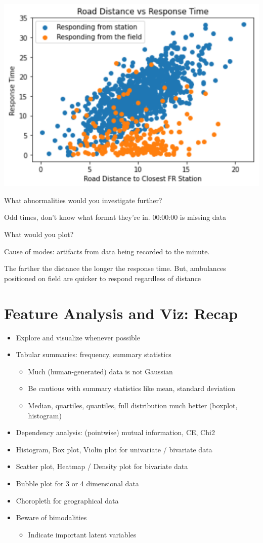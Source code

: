 \documentclass[11pt]{article}
\theoremstyle{definition}
\begin{document}
\includegraphics[width=\textwidth/2]{37.png}

What abnormalities would you investigate further?

Odd times, don't know what format they're in. 00:00:00 is missing data

What would you plot?

Cause of modes: artifacts from data being recorded to the minute.

The farther the distance the longer the response time. But, ambulances positioned on field are quicker to respond regardless of distance

\section{Feature Analysis and Viz: Recap}
\begin{itemize}
  \item Explore and visualize whenever possible
  \item Tabular summaries: frequency, summary statistics
  \begin{itemize}
    \item Much (human-generated) data is not Gaussian
    \item Be cautious with summary statistics like mean, standard deviation
    \item Median, quartiles, quantiles, full distribution much better (boxplot, histogram)
  \end{itemize}
  \item Dependency analysis: (pointwise) mutual information, CE, Chi2
  \item Histogram, Box plot, Violin plot for univariate / bivariate data
  \item Scatter plot, Heatmap / Density plot for bivariate data
  \item Bubble plot for 3 or 4 dimensional data
  \item Choropleth for geographical data
  \item Beware of bimodalities
  \begin{itemize}
    \item Indicate important latent variables
  \end{itemize}
\end{itemize}
\end{document}
